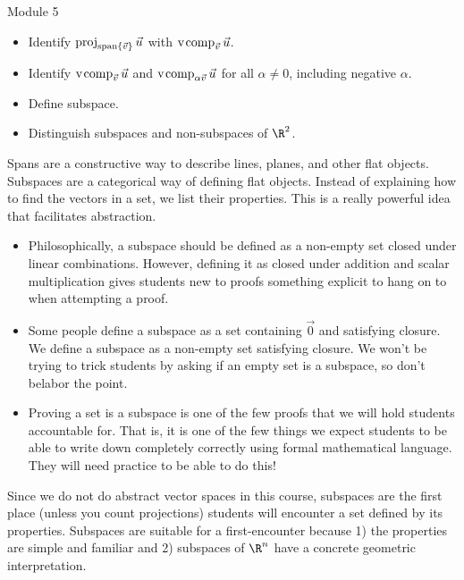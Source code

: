 \begin{lesson}

	Module 5

	\begin{itemize}
		\item Identify $\operatorname{proj}_{\operatorname{span}\{\vec v\}}\vec u$ with $\operatorname{\operatorname{v\hspace{1pt}comp}}_{\vec v}\vec u$.
		\item Identify $\operatorname{\operatorname{v\hspace{1pt}comp}}_{\vec v}\vec u$ and $\operatorname{\operatorname{v\hspace{1pt}comp}}_{\alpha\vec v}\vec u$
			for all $\alpha\neq 0$, including negative $\alpha$.
		\item Define subspace.
		\item Distinguish subspaces and non-subspaces of $\R^2$.
	\end{itemize}

	Spans are a constructive way to describe lines, planes, and other
	flat objects. Subspaces are a categorical way of defining flat objects.
	Instead of explaining how to find the vectors in a set, we list their
	properties. This is a really powerful idea that facilitates abstraction.

	\begin{annotation}
		\begin{notes}
			\begin{itemize}
			\item	Philosophically, a subspace should be defined
			as a non-empty set closed under linear combinations.
			However, defining it as closed under addition and scalar
			multiplication gives students new to proofs
			something explicit to hang on to when attempting a proof.
			\item Some people define a subspace as a set containing
			$\vec 0$ and satisfying closure. We define a subspace
			as a non-empty set satisfying closure. We won't be trying
			to trick students by asking if an empty set is a subspace,
			so don't belabor the point.
			\item Proving a set is a subspace is one of the few proofs
				that we will hold students accountable for. That is,
					it is one of the few things we expect
					students to be able to write down completely
					correctly using formal mathematical language.
					They will need practice to be able to do this!
			\end{itemize}
		\end{notes}
	\end{annotation}
	Since we do not do abstract vector spaces in this course, subspaces are
	the first place (unless you count projections) students will encounter
	a set defined by its properties. Subspaces are suitable for a first-encounter
	because 1) the properties are simple and familiar and 2) subspaces of $\R^n$
	have a concrete geometric interpretation.

\end{lesson}

